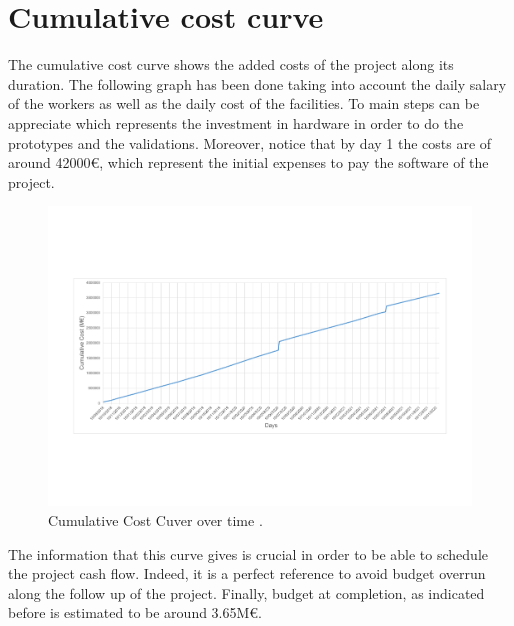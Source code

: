 \section{Cumulative cost curve}

The cumulative cost curve shows the added costs of the project along its duration. The following graph has been done taking into account the daily salary of the workers as well as the daily cost of the facilities. To main steps can be appreciate which represents the investment in hardware in order to do the prototypes and the validations. Moreover, notice that by day 1 the costs are of around 42000\euro, which represent the initial expenses to pay the software of the project.

\begin{figure}[H]
	\centering
	\includegraphics[width=0.65\linewidth]{./images/CumulativeCost}
	\caption[Cumulative Cost Cuver over time]{Cumulative Cost Cuver over time \cite{workfront2017}.}
	\label{fig:CumulativeCost}
\end{figure} 

The information that this curve gives is crucial in order to be able to schedule the project cash flow. Indeed, it is a perfect reference to avoid budget overrun along the follow up of the project. Finally, budget at completion, as indicated before is estimated to be around 3.65M\euro.